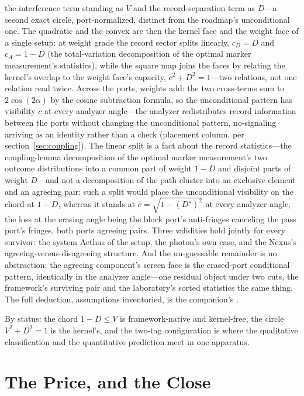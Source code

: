 \documentclass[11pt]{article}
\theoremstyle{definition}
\begin{document}
the interference term standing as $V$ and the record-separation term as $D$---a second exact circle, port-normalized, distinct from the roadmap's unconditional one. The quadratic and the convex are then the kernel face and the weight face of a single setup: at weight grade the record sector splits linearly, $c_D = D$ and $c_A = 1 - D$ (the total-variation decomposition of the optimal marker measurement's statistics), while the square map joins the faces by relating the kernel's overlap to the weight face's capacity, $c^2 + D^2 = 1$---two relations, not one relation read twice. Across the ports, weights add: the two cross-terms sum to $2\cos(2\alpha)$ by the cosine subtraction formula, so the unconditional pattern has visibility $c$ at every analyzer angle---the analyzer redistributes record information between the ports without changing the unconditional pattern, no-signaling arriving as an identity rather than a check (placement column, per section~\ref{sec:coupling}). The linear split is a fact about the record statistics---the coupling-lemma decomposition of the optimal marker measurement's two outcome distributions into a common part of weight $1 - D$ and disjoint parts of weight $D$---and not a decomposition of the path cluster into an exclusive element and an agreeing pair: such a split would place the unconditional visibility on the chord at $1 - D$, whereas it stands at $c = \sqrt{1 - (D^{\star})^2}$ at every analyzer angle, the loss at the erasing angle being the block port's anti-fringes canceling the pass port's fringes, both ports agreeing pairs. Three validities hold jointly for every survivor: the system Aethus of the setup, the photon's own case, and the Nexus's agreeing-versus-disagreeing structure. And the un-guessable remainder is no abstraction: the agreeing component's screen face is the erased-port conditional pattern, identically in the analyzer angle---one residual object under two cuts, the framework's surviving pair and the laboratory's sorted statistics the same thing. The full deduction, assumptions inventoried, is the companion's \cite{Aethus}.

By status: the chord $1 - D \le V$ is framework-native and kernel-free, the circle $V^2 + D^2 = 1$ is the kernel's, and the two-tag configuration is where the qualitative classification and the quantitative prediction meet in one apparatus.



\section{The Price, and the Close}\label{sec:close}
\end{document}
